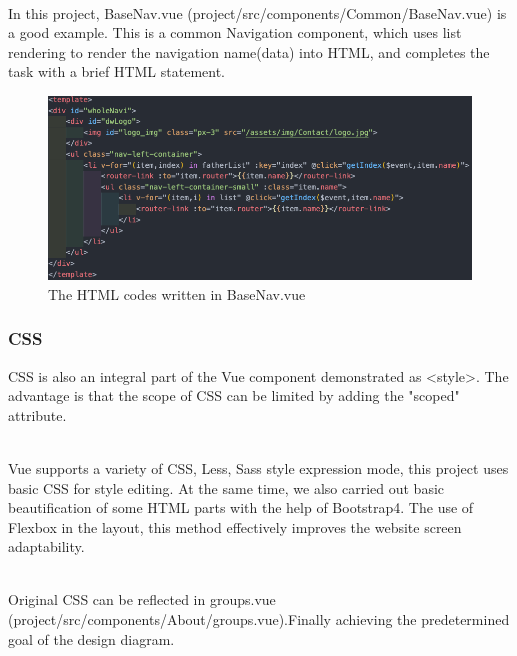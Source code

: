 \documentclass{article}
\begin{document}
~\\
\noindent
In this project, BaseNav.vue (project/src/components/Common/BaseNav.vue) 
is a good example. This is a common Navigation component, which uses list 
rendering to render the navigation name(data) into HTML, and completes 
the task with a brief HTML statement.

\begin{figure}[h]
    \centering
    \includegraphics[width=13cm]{img/exp/html.png}
    \caption{The HTML codes written in BaseNav.vue}
    \label{}
\end{figure}
\subsubsection{CSS}
CSS is also an integral part of the Vue component demonstrated 
as \textless style\textgreater. The advantage is that the scope of CSS can be 
limited by adding the "scoped" attribute.

~\\
\noindent
Vue supports a variety of CSS, Less, Sass style expression mode, 
this project uses basic CSS for style editing. At the same time, 
we also carried out basic beautification of some HTML parts with 
the help of Bootstrap4. The use of Flexbox in the layout, 
this method effectively improves the website screen adaptability.

~\\
\noindent
Original CSS  can be reflected in groups.vue 
(project/src/components/About/groups.vue).Finally achieving the 
predetermined goal of the design diagram.
\end{document}
